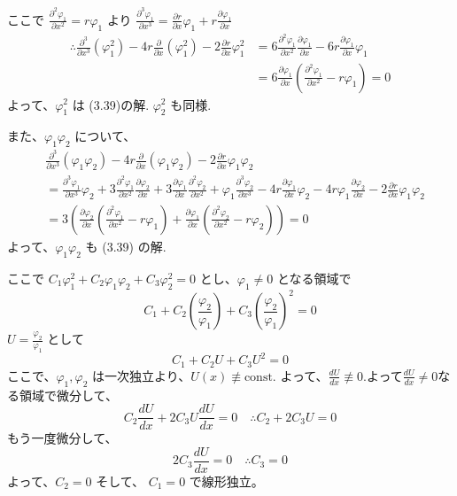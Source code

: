 \documentclass[paper=a4, fontsize=11pt]{jlreq} %
\theoremstyle{break}
\theoremstyle{qa}
\begin{document}
ここで $\frac{\partial^2 \varphi_1}{\partial x^2} = r\varphi_1$ より $\frac{\partial^3 \varphi_1}{\partial x^3} = \frac{\partial r}{\partial x}\varphi_1 + r\frac{\partial \varphi_1}{\partial x}$
\begin{align*}
    \therefore \frac{\partial^3}{\partial x^3}(\varphi_1^2) - 4r\frac{\partial}{\partial x}(\varphi_1^2) - 2\frac{\partial r}{\partial x}\varphi_1^2 &= 6\frac{\partial^2 \varphi_1}{\partial x^2}\frac{\partial \varphi_1}{\partial x} - 6r\frac{\partial \varphi_1}{\partial x}\varphi_1 \\
    &= 6\frac{\partial \varphi_1}{\partial x}\left(\frac{\partial^2 \varphi_1}{\partial x^2} - r\varphi_1\right) = 0
\end{align*}
よって、$\varphi_1^2$ は (3.39)の解. $\varphi_2^2$ も同様.

また、$\varphi_1\varphi_2$ について、
\begin{align*}
    & \frac{\partial^3}{\partial x^3}(\varphi_1\varphi_2) - 4r\frac{\partial}{\partial x}(\varphi_1\varphi_2) - 2\frac{\partial r}{\partial x}\varphi_1\varphi_2 \\
    &= \frac{\partial^3 \varphi_1}{\partial x^3}\varphi_2 + 3\frac{\partial^2 \varphi_1}{\partial x^2}\frac{\partial \varphi_2}{\partial x} + 3\frac{\partial \varphi_1}{\partial x}\frac{\partial^2 \varphi_2}{\partial x^2} + \varphi_1\frac{\partial^3 \varphi_2}{\partial x^3} - 4r\frac{\partial \varphi_1}{\partial x}\varphi_2 - 4r\varphi_1\frac{\partial \varphi_2}{\partial x} - 2\frac{\partial r}{\partial x}\varphi_1\varphi_2 \\
    &= 3\left( \frac{\partial \varphi_2}{\partial x}\left(\frac{\partial^2 \varphi_1}{\partial x^2} - r\varphi_1\right) + \frac{\partial \varphi_1}{\partial x}\left(\frac{\partial^2 \varphi_2}{\partial x^2} - r\varphi_2\right) \right) = 0
\end{align*}
よって、$\varphi_1\varphi_2$ も (3.39) の解.

ここで $C_1\varphi_1^2 + C_2\varphi_1\varphi_2 + C_3\varphi_2^2 = 0$ とし、$\varphi_1 \neq 0$ となる領域で
\begin{equation*}
    C_1 + C_2\left(\frac{\varphi_2}{\varphi_1}\right) + C_3\left(\frac{\varphi_2}{\varphi_1}\right)^2 = 0
\end{equation*}
$U = \frac{\varphi_2}{\varphi_1}$ として 
\[
C_1 + C_2U + C_3U^2 = 0
\]
ここで、$\varphi_1, \varphi_2$ は一次独立より、$U(x) \not\equiv \text{const.}$ よって、$\frac{dU}{dx} \not\equiv 0$.よって$\frac{dU}{dx} \neq 0$なる領域で微分して、
\begin{equation*}
    C_2\frac{dU}{dx} + 2C_3U\frac{dU}{dx} = 0 \quad \therefore C_2 + 2C_3U = 0
\end{equation*}
もう一度微分して、
\begin{equation*}
    2C_3 \frac{dU}{dx} = 0 \quad \therefore C_3 = 0
\end{equation*}
よって、$C_2 = 0$ そして、 $C_1 = 0$ で線形独立。
\end{document}
